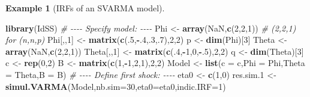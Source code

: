 \documentclass[
  12pt,
]{book}
\newenvironment{Shaded}{\begin{snugshade}}{\end{snugshade}}
\newcommand{\AttributeTok}[1]{\textcolor[rgb]{0.13,0.29,0.53}{#1}}
\newcommand{\CommentTok}[1]{\textcolor[rgb]{0.56,0.35,0.01}{\textit{#1}}}
\newcommand{\ConstantTok}[1]{\textcolor[rgb]{0.56,0.35,0.01}{#1}}
\newcommand{\DecValTok}[1]{\textcolor[rgb]{0.00,0.00,0.81}{#1}}
\newcommand{\FloatTok}[1]{\textcolor[rgb]{0.00,0.00,0.81}{#1}}
\newcommand{\FunctionTok}[1]{\textcolor[rgb]{0.13,0.29,0.53}{\textbf{#1}}}
\newcommand{\NormalTok}[1]{#1}
\newcommand{\OtherTok}[1]{\textcolor[rgb]{0.56,0.35,0.01}{#1}}
\newcommand{\SpecialCharTok}[1]{\textcolor[rgb]{0.81,0.36,0.00}{\textbf{#1}}}
\theoremstyle{definition}
\theoremstyle{definition}
\newtheorem{example}{Example}[chapter]
\theoremstyle{definition}
\theoremstyle{definition}
\theoremstyle{remark}
\begin{document}
\begin{example}[IRFs of an SVARMA model]
\begin{Shaded}
\begin{Highlighting}[]
\FunctionTok{library}\NormalTok{(IdSS)}
\CommentTok{\# {-}{-}{-}{-} Specify model: {-}{-}{-}{-}}
\NormalTok{Phi }\OtherTok{\textless{}{-}} \FunctionTok{array}\NormalTok{(}\ConstantTok{NaN}\NormalTok{,}\FunctionTok{c}\NormalTok{(}\DecValTok{2}\NormalTok{,}\DecValTok{2}\NormalTok{,}\DecValTok{1}\NormalTok{)) }\CommentTok{\# (2,2,1) for (n,n,p)}
\NormalTok{Phi[,,}\DecValTok{1}\NormalTok{] }\OtherTok{\textless{}{-}} \FunctionTok{matrix}\NormalTok{(}\FunctionTok{c}\NormalTok{(.}\DecValTok{5}\NormalTok{,}\SpecialCharTok{{-}}\NormalTok{.}\DecValTok{4}\NormalTok{,.}\DecValTok{3}\NormalTok{,.}\DecValTok{7}\NormalTok{),}\DecValTok{2}\NormalTok{,}\DecValTok{2}\NormalTok{)}
\NormalTok{p }\OtherTok{\textless{}{-}} \FunctionTok{dim}\NormalTok{(Phi)[}\DecValTok{3}\NormalTok{]}
\NormalTok{Theta }\OtherTok{\textless{}{-}} \FunctionTok{array}\NormalTok{(}\ConstantTok{NaN}\NormalTok{,}\FunctionTok{c}\NormalTok{(}\DecValTok{2}\NormalTok{,}\DecValTok{2}\NormalTok{,}\DecValTok{1}\NormalTok{))}
\NormalTok{Theta[,,}\DecValTok{1}\NormalTok{] }\OtherTok{\textless{}{-}} \FunctionTok{matrix}\NormalTok{(}\FunctionTok{c}\NormalTok{(.}\DecValTok{4}\NormalTok{,}\SpecialCharTok{{-}}\DecValTok{1}\NormalTok{,}\DecValTok{0}\NormalTok{,}\SpecialCharTok{{-}}\NormalTok{.}\DecValTok{5}\NormalTok{),}\DecValTok{2}\NormalTok{,}\DecValTok{2}\NormalTok{)}
\NormalTok{q }\OtherTok{\textless{}{-}} \FunctionTok{dim}\NormalTok{(Theta)[}\DecValTok{3}\NormalTok{]}
\NormalTok{c }\OtherTok{\textless{}{-}} \FunctionTok{rep}\NormalTok{(}\DecValTok{0}\NormalTok{,}\DecValTok{2}\NormalTok{)}
\NormalTok{B }\OtherTok{\textless{}{-}} \FunctionTok{matrix}\NormalTok{(}\FunctionTok{c}\NormalTok{(}\DecValTok{1}\NormalTok{,}\SpecialCharTok{{-}}\DecValTok{1}\NormalTok{,}\DecValTok{2}\NormalTok{,}\DecValTok{1}\NormalTok{),}\DecValTok{2}\NormalTok{,}\DecValTok{2}\NormalTok{)}
\NormalTok{Model }\OtherTok{\textless{}{-}} \FunctionTok{list}\NormalTok{(}\AttributeTok{c =}\NormalTok{ c,}\AttributeTok{Phi =}\NormalTok{ Phi,}\AttributeTok{Theta =}\NormalTok{ Theta,}\AttributeTok{B =}\NormalTok{ B)}
\CommentTok{\# {-}{-}{-}{-} Define first shock: {-}{-}{-}{-}}
\NormalTok{eta0 }\OtherTok{\textless{}{-}} \FunctionTok{c}\NormalTok{(}\DecValTok{1}\NormalTok{,}\DecValTok{0}\NormalTok{)}
\NormalTok{res.sim}\FloatTok{.1} \OtherTok{\textless{}{-}} \FunctionTok{simul.VARMA}\NormalTok{(Model,}\AttributeTok{nb.sim=}\DecValTok{30}\NormalTok{,}\AttributeTok{eta0=}\NormalTok{eta0,}\AttributeTok{indic.IRF=}\DecValTok{1}\NormalTok{)}

\end{Highlighting}
\end{Shaded}
\end{example}
\end{document}
